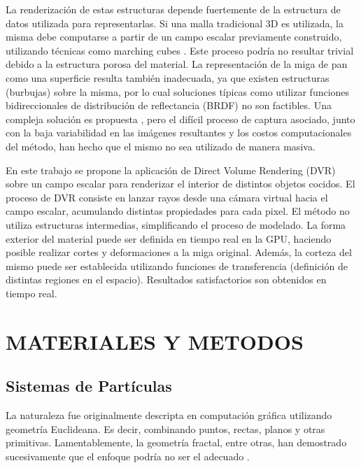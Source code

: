 \documentclass[oneside,a4paper,spanish,links]{amca}
\begin{document}
La renderizaci\'on de estas estructuras depende fuertemente de la estructura de datos utilizada para representarlas. Si una malla tradicional 3D es utilizada, la misma debe computarse a partir de un campo escalar previamente construido, utilizando t\'ecnicas como 
marching cubes \citep{Lorensen1987}. Este proceso podr\'ia no resultar trivial debido a la estructura porosa del material. La representaci\'on de la miga de pan como una superficie resulta tambi\'en inadecuada, ya que existen estructuras (burbujas) sobre la misma, por lo cual soluciones t\'ipicas como utilizar funciones bidireccionales de distribuci\'on de reflectancia (BRDF) \citep{Kurt2009} no son factibles. Una compleja soluci\'on es propuesta \citep{Tong2005}, pero el dif\'icil proceso de captura asociado, junto con la baja variabilidad en las im\'agenes resultantes y los costos computacionales del m\'etodo, han hecho que el mismo no sea utilizado de manera masiva. 

En este trabajo se propone la aplicaci\'on de Direct Volume Rendering (DVR) \citep{Levoy1988, Kratz2006} sobre un campo escalar para renderizar el interior de distintos objetos cocidos. El proceso de DVR consiste en lanzar rayos desde una c\'amara virtual hacia el campo escalar, acumulando distintas propiedades para cada pixel. El m\'etodo no utiliza estructuras intermedias, simplificando el proceso de modelado. La forma exterior del material puede ser definida en tiempo real en la GPU, haciendo posible realizar cortes y deformaciones a la miga original. Adem\'as, la corteza del mismo puede ser establecida utilizando funciones de transferencia (definici\'on de distintas regiones en el espacio). Resultados satisfactorios son obtenidos en tiempo real.

\section{MATERIALES Y METODOS}

\subsection{Sistemas de Part\'iculas}

La naturaleza fue originalmente descripta en computaci\'on gr\'afica utilizando geometr\'ia Euclideana. Es decir, combinando puntos, rectas, planos y otras primitivas. Lamentablemente, la geometr\'ia fractal, entre otras, han demostrado sucesivamente que el enfoque podr\'ia no ser el adecuado \citep{Mandelbrot83}.
\end{document}
